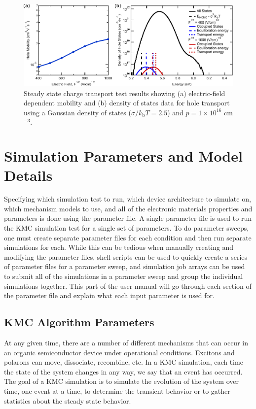 \documentclass[%
 reprint,onecolumn,notitlepage,
superscriptaddress,longbibliography,
 amsmath,amssymb,
 aps,rmp,floatfix,
]{revtex4-1}
\begin{document}
\begin{figure}[h]
    \centering
    \includegraphics{Steady_transport_example_data.pdf}
    \caption{Steady state charge transport test results showing (a) electric-field dependent mobility and (b) density of states data for hole transport using a Gaussian density of states ($\sigma / k_\text{b}T = 2.5$) and $p = 1 \times 10^{16}$ cm$^{-3}$.}
    \label{fig:steady_transport_example}
\end{figure}

\section{Simulation Parameters and Model Details}

Specifying which simulation test to run, which device architecture to simulate on, which mechanism models to use, and all of the electronic materials properties and parameters is done using the parameter file.
A single parameter file is used to run the KMC simulation test for a single set of parameters.
To do parameter sweeps, one must create separate parameter files for each condition and then run separate simulations for each.
While this can be tedious when manually creating and modifying the parameter files, shell scripts can be used to quickly create a series of parameter files for a parameter sweep, and simulation job arrays can be used to submit all of the simulations in a parameter sweep and group the individual simulations together.
This part of the user manual will go through each section of the parameter file and explain what each input parameter is used for.

\subsection{KMC Algorithm Parameters}\label{sub:KMC_algorithms}

At any given time, there are a number of different mechanisms that can occur in an organic semiconductor device under operational conditions. 
Excitons and polarons can move, dissociate, recombine, etc. 
In a KMC simulation, each time the state of the system changes in any way, we say that an event has occurred. The goal of a KMC simulation is to simulate the evolution of the system over time, one event at a time, to determine the transient behavior or to gather statistics about the steady state behavior.
\end{document}
